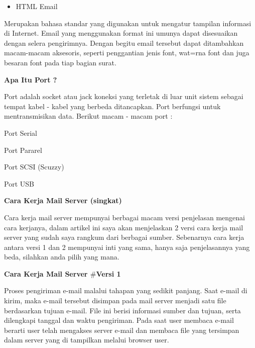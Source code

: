 \documentclass[a4paper,12pt]{report}
\begin{document}
\begin{myEnumerate}
\begin{itemize}
\noindent 
\item HTML Email\end{itemize}
 \par
Merupakan bahasa standar yang digunakan untuk mengatur tampilan informasi di Internet. Email yang menggunakan format ini umunya dapat disesuaikan dengan selera pengirimnya. Dengan begitu email tersebut dapat ditambahkan macam-macam aksesoris, seperti penggantian jenis font, wat=rna font dan juga besaran font pada tiap bagian surat. \par
\vspace{12pt}
\noindent 
\textbf{Apa Itu Port ?} \par
Port adalah socket atau jack koneksi yang terletak di luar unit sistem sebagai tempat kabel - kabel yang berbeda ditancapkan. Port berfungsi untuk mentransmisikan data. Berikut macam - macam port : \par
\noindent 
\begin{myEnumerate}
\item Port Serial \par
\noindent 
\item Port Pararel \par
\noindent 
\item Port SCSI (Scuzzy) \par
\noindent 
\item Port USB \end{myEnumerate}
 \par
\vspace{12pt}
\noindent 
\textbf{Cara Kerja Mail Server (singkat)} \par
Cara kerja mail server mempunyai berbagai macam versi penjelasan mengenai cara kerjanya, dalam artikel ini saya akan menjelaskan 2 versi cara kerja mail server yang sudah saya rangkum dari berbagai sumber. Sebenarnya cara kerja antara versi 1 dan 2 mempunyai inti yang sama, hanya saja penjelasannya yang beda, silahkan anda pilih yang mana. \par
\vspace{12pt}
\noindent 
\textbf{Cara Kerja Mail Server  $  \#  $Versi 1} \par
Proses pengiriman e-mail malalui tahapan yang sedikit panjang. Saat e-mail di kirim, maka e-mail tersebut disimpan pada mail server menjadi satu file berdasarkan tujuan e-mail. File ini berisi informasi sumber dan tujuan, serta dilengkapi tanggal dan waktu pengiriman. Pada saat user membaca e-mail berarti user telah mengakses server e-mail dan membaca file yang tersimpan dalam server yang di tampilkan melalui browser user. \par

\end{myEnumerate}
\end{document}
